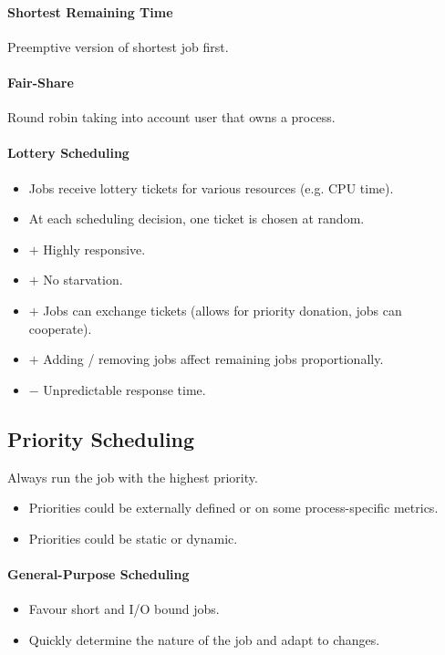 \documentclass[twocolumn,english]{article}
\begin{document}
\paragraph{Shortest Remaining Time}

Preemptive version of shortest job first.


\paragraph{Fair-Share}

Round robin taking into account user that owns a process.


\paragraph{Lottery Scheduling}
\begin{itemize}
\item Jobs receive lottery tickets for various resources (e.g. CPU time). 
\item At each scheduling decision, one ticket is chosen at random. 
\item $+$ Highly responsive. 
\item $+$ No starvation. 
\item $+$ Jobs can exchange tickets (allows for priority donation, jobs
can cooperate). 
\item $+$ Adding / removing jobs affect remaining jobs proportionally. 
\item $-$ Unpredictable response time. 
\end{itemize}

\subsection{Priority Scheduling}

Always run the job with the highest priority. 
\begin{itemize}
\item Priorities could be externally defined or on some process-specific
metrics. 
\item Priorities could be static or dynamic. 
\end{itemize}

\paragraph{General-Purpose Scheduling}
\begin{itemize}
\item Favour short and I/O bound jobs. 
\item Quickly determine the nature of the job and adapt to changes. 
\end{itemize}
\end{document}
